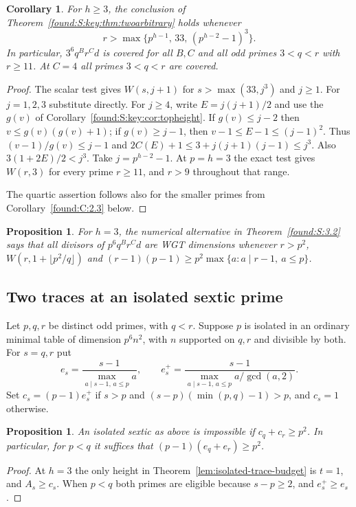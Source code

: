 \documentclass[11pt,a4paper]{article}
\numberwithin{equation}{section}
\newtheorem{proposition}[theorem]{Proposition}
\newtheorem{corollary}[theorem]{Corollary}
\theoremstyle{remark}
\begin{document}
\begin{corollary}\label{found:S:3.3}\label{found:S:key:cor:allthree}
For $h\ge3$, the conclusion of Theorem~\ref{found:S:key:thm:twoarbitrary}
holds whenever
\[
 r>\max\bigl\{p^{h-1},\,33,\,(p^{h-2}-1)^3\bigr\}.
\]
In particular, $3^6q^B r^C d$ is covered for all $B,C$ and all odd
primes $3<q<r$ with $r\ge11$. At $C=4$ all primes $3<q<r$ are
covered.
\end{corollary}
\begin{proof}
The scalar test gives $W(s,j+1)$ for $s>\max(33,j^3)$ and $j\ge1$.
For $j=1,2,3$ substitute directly. For $j\ge4$, write $E=j(j+1)/2$
and use the $g(v)$ of Corollary~\ref{found:S:key:cor:topheight}. If $g(v)\le j-2$
then $v\le g(v)(g(v)+1)$; if $g(v)\ge j-1$, then $v-1\le E-1
\le(j-1)^2$. Thus $(v-1)/g(v)\le j-1$ and
$2C(E)+1\le3+j(j+1)(j-1)\le j^3$. Also $3(1+2E)/2<j^3$.
Take $j=p^{h-2}-1$. At $p=h=3$ the exact test gives $W(r,3)$
for every prime $r\ge11$, and $r>9$ throughout that range.

The quartic assertion follows also for the smaller primes from
Corollary~\ref{found:C:2.3} below.
\end{proof}
\begin{proposition}\label{found:S:3.4}\label{found:S:key:prop:sexticorb}
For $h=3$, the numerical alternative in Theorem~\ref{found:S:3.2}
says that all divisors of $p^6q^B r^C d$ are WGT dimensions whenever
$r>p^2$, $W(r,1+\lfloor p^2/q\rfloor)$ and
$(r-1)(p-1)\ge p^2\max\{a:a\mid r-1,\ a\le p\}$.
\end{proposition}

\subsection{Two traces at an isolated sextic prime}\label{found:C:2}
\label{found:C:key:sec:oddrectangle}
Let $p,q,r$ be distinct odd primes, with $q<r$. Suppose $p$ is
isolated in an ordinary minimal table of dimension $p^6 n^2$,
with $n$ supported on $q,r$ and divisible by both.
For $s=q,r$ put
\[
 e_s=\frac{s-1}{\max_{a\mid s-1,\,a\le p}a},\qquad
 e_s^+=\frac{s-1}{\max_{a\mid s-1,\,a\le p}a/\gcd(a,2)}.
\]
Set $c_s=(p-1)e_s^+$ if $s>p$ and
$(s-p)(\min(p,q)-1)>p$, and $c_s=1$ otherwise.
\begin{proposition}\label{found:C:2.1}\label{found:C:key:prop:sexticrect}
An isolated sextic as above is impossible if $c_q+c_r\ge p^2$.
In particular, for $p<q$ it suffices that $(p-1)(e_q+e_r)\ge p^2$.
\end{proposition}
\begin{proof}
At $h=3$ the only height in Theorem~\ref{lem:isolated-trace-budget}
is $t=1$, and $A_s\ge c_s$. When $p<q$ both primes are eligible
because $s-p\ge2$, and $e_s^+\ge e_s$.
\end{proof}
\end{document}

